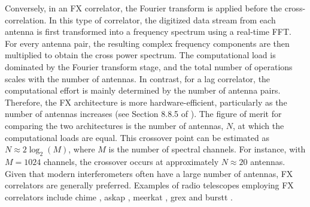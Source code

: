Conversely, in an FX correlator, the Fourier transform is applied before the cross-correlation. In this type of correlator, the digitized data stream from each antenna is first transformed into a frequency spectrum using a real-time FFT. For every antenna pair, the resulting complex frequency components are then multiplied to obtain the cross power spectrum. The computational load is dominated by the Fourier transform stage, and the total number of operations scales with the number of antennas. In contrast, for a lag correlator, the computational effort is mainly determined by the number of antenna pairs. Therefore, the FX architecture is more hardware-efficient, particularly as the number of antennas increases (see Section 8.8.5 of \citealt{thompson2017interferometry}). The figure of merit for comparing the two architectures is the number of antennas, $N$, at which the computational loads are equal. This crossover point can be estimated as $N \approx 2 \log_2(M)$, where $M$ is the number of spectral channels. For instance, with $M = 1024$ channels, the crossover occurs at approximately $N \approx 20$ antennas. Given that modern interferometers often have a large number of antennas, FX correlators are generally preferred.
Examples of radio telescopes employing FX correlators include \gls{chime} \citep{CHIME/FRB_2018}, \gls{askap} \citep{Shannon_2025}, \gls{meerkat} \citep{MeerKAT}, \gls{grex} \citep{GReX} and \gls{burstt} \citep{BURSTT}.

